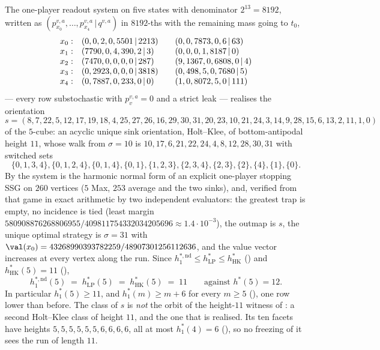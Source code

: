 
\begin{theorem}[$h^{\ast,\mathrm{nd}}_{1}(5)=h^{\ast}_{\mathrm{LP}}(5)=h^{\ast}_{\mathrm{HK}}(5)=11$]
\label{oc:hstar-one-five-eleven}
The one-player readout system on five states with denominator $2^{13}=8192$,
written as $(p^{v,a}_{x_0},\dots,p^{v,a}_{x_4}\,|\,q^{v,a})$ in $8192$-ths with
the remaining mass going to $t_0$,
\[
 \begin{array}{r@{\quad}l@{\qquad}l}
  x_0: & (0,0,2,0,5501\,|\,2213) & (0,0,7873,0,6\,|\,63)\\
  x_1: & (7790,0,4,390,2\,|\,3) & (0,0,0,1,8187\,|\,0)\\
  x_2: & (7470,0,0,0,0\,|\,287) & (9,1367,0,6808,0\,|\,4)\\
  x_3: & (0,2923,0,0,0\,|\,3818) & (0,498,5,0,7680\,|\,5)\\
  x_4: & (0,7887,0,233,0\,|\,0) & (1,0,8072,5,0\,|\,111)
 \end{array}
\]
--- every row substochastic with $p^{v,a}_v=0$ and a strict leak --- realises
the orientation
\[
 s=(8,7,22,5,12,17,19,18,4,25,27,26,16,29,30,31,
    20,23,10,21,24,3,14,9,28,15,6,13,2,11,1,0)
\]
of the $5$-cube: an acyclic unique sink orientation, Holt--Klee, of
bottom-antipodal height $11$, whose walk from $\sigma=10$ is
$10,17,6,21,22,24,4,8,12,28,30,31$ with switched sets
\[
 \{0,1,3,4\},\{0,1,2,4\},\{0,1,4\},\{0,1\},\{1,2,3\},
 \{2,3,4\},\{2,3\},\{2\},\{4\},\{1\},\{0\}.
\]
By  the system is the harmonic normal form of an explicit
one-player stopping SSG on $260$ vertices ($5$ Max, $253$ average and the two
sinks), and, verified from that game in exact arithmetic by two independent
evaluators: the greatest trap is empty, no incidence is tied (least margin
$580908876268806955/409811754332034205696\approx1.4\cdot10^{-3}$), the outmap
is $s$, the unique optimal strategy is $\sigma=31$ with
$\val(x_0)=43268990393782259/48907301256112636$, and the value vector
increases at every vertex along the run. Since
$h^{\ast,\mathrm{nd}}_{1}\le h^{\ast}_{\mathrm{LP}}\le h^{\ast}_{\mathrm{HK}}$
() and $h^{\ast}_{\mathrm{HK}}(5)=11$
(),
\[
  h^{\ast,\mathrm{nd}}_{1}(5)\;=\;h^{\ast}_{\mathrm{LP}}(5)\;=\;h^{\ast}_{\mathrm{HK}}(5)\;=\;11
  \qquad\text{against } h^{\ast}(5)=12 .
\]
In particular $h^{\ast}_{1}(5)\ge11$, and $h^{\ast}_{1}(m)\ge m+6$ for
every $m\ge5$ (), one row lower than before.
The class of $s$ is \emph{not} the orbit of the height-$11$ witness of
: a second Holt--Klee class of height $11$, and the one that
is realised. Its ten facets have heights $5,5,5,5,5,5,6,6,6,6$, all at most
$h^{\ast}_{1}(4)=6$ (), so no freezing of it sees the
run of length $11$.
\end{theorem}

